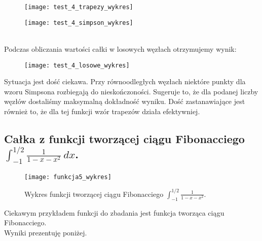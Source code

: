 \documentclass{article}
\begin{document}
  \begin{minipage}{\linewidth}
      \centering
      \begin{minipage}{0.35\linewidth}
          \begin{figure}[H]
              \texttt{[image: test\_4\_trapezy\_wykres]}
          \end{figure}
      \end{minipage}
      \hspace{0.05\linewidth}
      \begin{minipage}{0.35\linewidth}
          \begin{figure}[H]
              \texttt{[image: test\_4\_simpson\_wykres]}
          \end{figure}
      \end{minipage}
  \end{minipage}\\

Podczas obliczania wartości całki w losowych węzłach otrzymujemy wynik:

\begin{figure}[h!]
\centering
\texttt{[image: test\_4\_losowe\_wykres]}
\end{figure}

Sytuacja jest dość ciekawa. Przy równoodległych węzłach niektóre punkty dla wzoru Simpsona rozbiegają do nieskończoności. Sugeruje to, że dla podanej liczby węzłów dostaliśmy maksymalną dokładność wyniku. Dość zastanawiające jest również to, że dla tej funkcji wzór trapezów działa efektywniej.

\pagebreak



\subsection{Całka z funkcji tworzącej ciągu Fibonacciego $\int_{-1}^{1/2} \frac{1}{1-x-x^2} \ dx$.}

\begin{figure}[h!]
\centering
\texttt{[image: funkcja5\_wykres]}
\caption{Wykres funkcji tworzącej ciągu Fibonacciego $\int_{-1}^{1/2} \frac{1}{1-x-x^2}$.}	
\end{figure}

Ciekawym przykładem funkcji do zbadania jest funkcja tworząca ciągu Fibonacciego.\\ Wyniki prezentuję poniżej.
\end{document}
